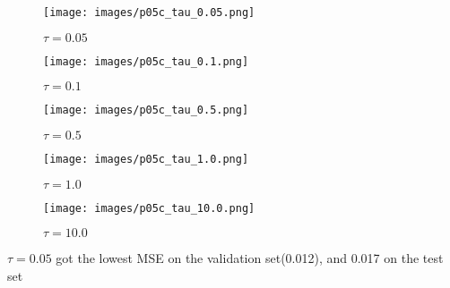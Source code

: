 \documentclass{article}
\begin{document}
\begin{figure}
  \centering
  \texttt{[image: images/p05c\_tau\_0.05.png]}
  \caption{$\tau=0.05$}
  \label{fig:enter-label}
\end{figure}

\begin{figure}
  \centering
  \texttt{[image: images/p05c\_tau\_0.1.png]}
  \caption{$\tau=0.1$}
  \label{fig:enter-label}
\end{figure}

\begin{figure}[h]
  \centering
  \texttt{[image: images/p05c\_tau\_0.5.png]}
  \caption{$\tau=0.5$}
  \label{fig:enter-label}
\end{figure}

\begin{figure}[h]
  \centering
  \texttt{[image: images/p05c\_tau\_1.0.png]}
  \caption{$\tau=1.0$}
  \label{fig:enter-label}
\end{figure}

\begin{figure}[h]
  \centering
  \texttt{[image: images/p05c\_tau\_10.0.png]}
  \caption{$\tau=10.0$}
  \label{fig:enter-label}
\end{figure}

$\tau=0.05$ got the lowest MSE on the validation set(0.012), and 0.017 on the test set
\end{document}
